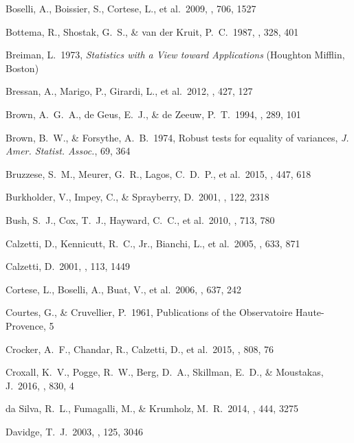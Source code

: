  Boselli, A., Boissier, S., Cortese, L., et al.\ 2009, \apj, 706, 1527 


 Bottema, R., Shostak, G.~S., \& van der Kruit, P.~C.\ 1987, \nat, 328, 401 

 Breiman, L.\ 1973, \emph{Statistics
with a View toward Applications} (Houghton Mifflin, Boston)

 Bressan, A., Marigo, P., Girardi, L., et al.\ 2012, \mnras, 427, 127 

 Brown, A.~G.~A., de Geus, E.~J., \& de Zeeuw, P.~T.\ 1994, \aap, 289, 101 

 Brown, B.~W., \& Forsythe,
A.~B.\ 1974, Robust tests for equality of
variances, \emph{J. Amer. Statist. Assoc.}, 69, 364

 Bruzzese, S.~M., Meurer, G.~R., Lagos, C.~D.~P., et al.\ 2015, \mnras, 447, 618 

 Burkholder, V., Impey, C., \& Sprayberry, D.\ 2001, \aj, 122, 2318 

 Bush, S.~J., Cox, T.~J., Hayward, C.~C., et al.\ 2010, \apj, 713, 780 

 Calzetti, D., Kennicutt, R.~C., Jr., Bianchi, L., et al.\ 2005, \apj, 633, 871 


 Calzetti, D.\ 2001, \pasp, 113, 1449 


 Cortese, L., Boselli, A., Buat, V., et al.\ 2006, \apj, 637, 242 


 Courtes, G., \& Cruvellier, P.\ 1961, Publications of the Observatoire Haute-Provence, 5


 Crocker, A.~F., Chandar, R., Calzetti, D., et al.\ 2015, \apj, 808, 76 

 Croxall, K.~V., Pogge, R.~W., Berg, D.~A., Skillman, E.~D., \& Moustakas, J.\ 2016, \apj, 830, 4 

 da Silva, R.~L., Fumagalli, M., \& Krumholz, M.~R.\ 2014, \mnras, 444, 3275 

 Davidge, T.~J.\ 2003, \aj, 125, 3046 


